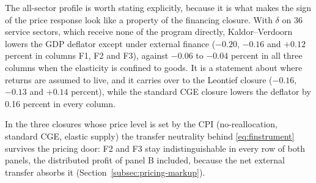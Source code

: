 The all-sector profile is worth stating explicitly, because it is what makes the
sign of the price response look like a property of the financing closure. With
$\delta$ on 36 service sectors, which receive none of the program directly,
Kaldor--Verdoorn lowers the GDP deflator except under external finance
($-0.20$, $-0.16$ and $+0.12$ percent in columns F1, F2 and F3), against
$-0.06$ to $-0.04$ percent in all three columns when the elasticity is confined
to goods. It is a statement about where returns are assumed to live,
and it carries over to the Leontief closure ($-0.16$, $-0.13$ and $+0.14$
percent), while the standard CGE closure lowers the deflator by 0.16 percent in
every column.

In the three closures whose price level is set by the CPI (no-reallocation,
standard CGE, elastic supply) the transfer neutrality behind
\eqref{eq:finstrument} survives the pricing door: F2 and F3 stay
indistinguishable in every row of both panels, the distributed profit of panel B
included, because the net external transfer absorbs it
(Section~\ref{subsec:pricing-markup}).

\clearpage

